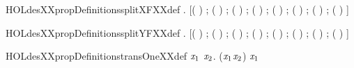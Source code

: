 \begin{SaveVerbatim}{HOLdesXXpropDefinitionssplitXFXXdef}
\HOLTokenTurnstile{} \HOLSymConst{\HOLTokenForall{}}.
       \HOLSymConst{=}
     [( \HOLSymConst{\HOLTokenExtract{}} ) ; ( \HOLSymConst{\HOLTokenExtract{}} ) ; ( \HOLSymConst{\HOLTokenExtract{}} ) ; ( \HOLSymConst{\HOLTokenExtract{}} ) ;
      ( \HOLSymConst{\HOLTokenExtract{}} ) ; ( \HOLSymConst{\HOLTokenExtract{}} ) ; ( \HOLSymConst{\HOLTokenExtract{}} ) ;
      ( \HOLSymConst{\HOLTokenExtract{}} ) ]
\end{SaveVerbatim}
\newcommand{\HOLdesXXpropDefinitionssplitXFXXdef}{\UseVerbatim{HOLdesXXpropDefinitionssplitXFXXdef}}
\begin{SaveVerbatim}{HOLdesXXpropDefinitionssplitYFXXdef}
\HOLTokenTurnstile{} \HOLSymConst{\HOLTokenForall{}}.
       \HOLSymConst{=}
     [( \HOLSymConst{\HOLTokenExtract{}} ) ; ( \HOLSymConst{\HOLTokenExtract{}} ) ; ( \HOLSymConst{\HOLTokenExtract{}} ) ; ( \HOLSymConst{\HOLTokenExtract{}} ) ;
      ( \HOLSymConst{\HOLTokenExtract{}} ) ; ( \HOLSymConst{\HOLTokenExtract{}} ) ; ( \HOLSymConst{\HOLTokenExtract{}} ) ;
      ( \HOLSymConst{\HOLTokenExtract{}} ) ]
\end{SaveVerbatim}
\newcommand{\HOLdesXXpropDefinitionssplitYFXXdef}{\UseVerbatim{HOLdesXXpropDefinitionssplitYFXXdef}}
\begin{SaveVerbatim}{HOLdesXXpropDefinitionstransOneXXdef}
\HOLTokenTurnstile{} \HOLSymConst{\HOLTokenForall{}}\ensuremath{\HOLBoundVar{x}\sb{\mathrm{1}}} \ensuremath{\HOLBoundVar{x}\sb{\mathrm{2}}}.  (\ensuremath{\HOLBoundVar{x}\sb{\mathrm{1}}}\HOLSymConst{,}\ensuremath{\HOLBoundVar{x}\sb{\mathrm{2}}}) \HOLSymConst{=} \ensuremath{\HOLBoundVar{x}\sb{\mathrm{1}}}
\end{SaveVerbatim}

